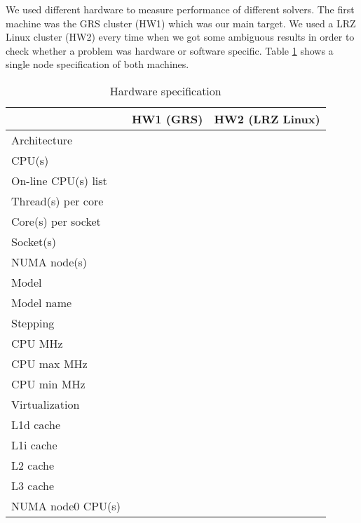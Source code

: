 We used different hardware to measure performance of different solvers. The first machine was the GRS cluster (HW1) which was our main target. We used a LRZ Linux cluster (HW2) every time when we got some ambiguous results in order to check whether a problem was hardware or software specific. Table \ref{table:hardware-spec} shows a single node specification of both machines. 


\begin{table}[ht]
\centering
\begin{tabular}{|l|l|l|}
\hline
                    & HW1 (GRS) & HW2 (LRZ Linux) \\ \hline
Architecture        &           &                 \\ \hline
CPU(s)              &           &                 \\ \hline
On-line CPU(s) list &           &                 \\ \hline
Thread(s) per core  &           &                 \\ \hline
Core(s) per socket  &           &                 \\ \hline
Socket(s)           &           &                 \\ \hline
NUMA node(s)        &           &                 \\ \hline
Model               &           &                 \\ \hline
Model name          &           &                 \\ \hline
Stepping            &           &                 \\ \hline
CPU MHz             &           &                 \\ \hline
CPU max MHz         &           &                 \\ \hline
CPU min MHz         &           &                 \\ \hline
Virtualization      &           &                 \\ \hline
L1d cache           &           &                 \\ \hline
L1i cache           &           &                 \\ \hline
L2 cache            &           &                 \\ \hline
L3 cache            &           &                 \\ \hline
NUMA node0 CPU(s)   &           &                 \\ \hline
\end{tabular}
\caption{Hardware specification}
\label{table:hardware-spec}
\end{table}

\newpage

